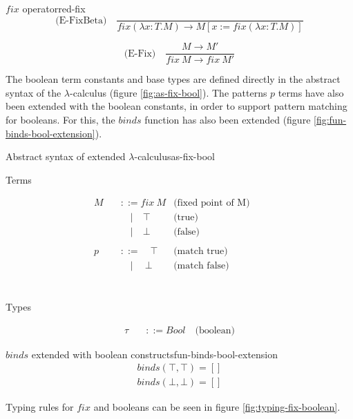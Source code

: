 \documentclass{article}
\begin{document}
\begin{myfigure}{$fix$ operator}{red-fix}
\[
\text{(E-FixBeta)} \quad \frac{}{fix(\lambda x : T.M) \rightarrow M[x := fix(\lambda x : T.M)]}
\]

\[
\text{(E-Fix)} \quad \frac{M \rightarrow M'}{fix \ M \rightarrow fix \ M'}
\]
\end{myfigure}


The boolean term constants and base types are defined directly in the abstract syntax of the $\lambda$-calculus (figure \ref{fig:as-fix-bool}). The patterns $p$ terms have also been extended with the boolean constants, in order to support pattern matching for booleans. For this, the $binds$ function has also been extended (figure \ref{fig:fun-binds-bool-extension}).

\begin{myfigure}{Abstract syntax of extended $\lambda$-calculus}{as-fix-bool}
\begin{center}
Terms
\end{center}
\[
\begin{aligned}
M \quad &::= fix \ M &\text{(fixed point of M)} &&\\
& \quad | \quad \top &\text{(true)} &&\\
& \quad | \quad \bot &\text{(false)} &&\\
\\
p \quad &::= \quad \top &\text{(match true)} &&\\
& \quad | \quad \ \bot &\text{(match false)} &&\\
\end{aligned}
\]
\\
\begin{center}
Types
\end{center}
\[
\begin{aligned}
\tau \quad &::= Bool \quad \text{(boolean)}
\end{aligned}
\]
\end{myfigure}

\begin{myfigure}{$binds$ extended with boolean constructs}{fun-binds-bool-extension}
\[
\begin{aligned}
binds(\top,\top) = []\\
binds(\bot,\bot) = []
\end{aligned}
\]
\end{myfigure}

Typing rules for $fix$ and booleans can be seen in figure \ref{fig:typing-fix-boolean}.
\end{document}
